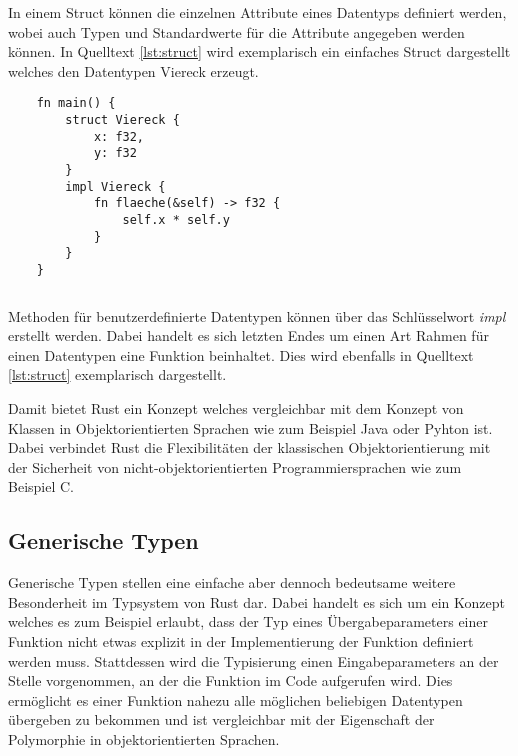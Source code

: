 In einem Struct können die einzelnen Attribute eines Datentyps definiert werden, wobei auch Typen und Standardwerte für die Attribute angegeben werden können. \autocite{rust-the-book}\autocite{rust-by-example} In Quelltext \ref{lst:struct} wird exemplarisch ein einfaches Struct dargestellt welches den Datentypen Viereck erzeugt.

\begin{verbatim}
    fn main() {
        struct Viereck {
            x: f32,
            y: f32
        }
        impl Viereck {
            fn flaeche(&self) -> f32 {
                self.x * self.y
            }
        }
    }
\end{verbatim}
\begin{lstlisting}[caption={Einfaches Struct und zugeh"orige Methode \\Quelle: \autocite{rust-the-book}}, label={lst:struct}]
\end{lstlisting}

Methoden für benutzerdefinierte Datentypen können über das Schlüsselwort \textit{impl} erstellt werden. Dabei handelt es sich letzten Endes um einen Art Rahmen für einen Datentypen eine Funktion beinhaltet. Dies wird ebenfalls in Quelltext \ref{lst:struct} exemplarisch dargestellt.

Damit bietet Rust ein Konzept welches vergleichbar mit dem Konzept von Klassen in Objektorientierten Sprachen wie zum Beispiel Java oder Pyhton ist. Dabei verbindet Rust die Flexibilitäten der klassischen Objektorientierung mit der Sicherheit von nicht-objektorientierten Programmiersprachen wie zum Beispiel C.

\subsection{Generische Typen}

Generische Typen stellen eine einfache aber dennoch bedeutsame weitere Besonderheit im Typsystem von Rust dar. Dabei handelt es sich um ein Konzept welches es zum Beispiel erlaubt, dass der Typ eines Übergabeparameters einer Funktion nicht etwas explizit in der Implementierung der Funktion definiert werden muss. Stattdessen wird die Typisierung einen Eingabeparameters an der Stelle vorgenommen, an der die Funktion im Code aufgerufen wird. \autocite{rust-the-book}\autocite{rust-by-example} Dies ermöglicht es einer Funktion nahezu alle möglichen beliebigen Datentypen übergeben zu bekommen und ist vergleichbar mit der Eigenschaft der Polymorphie in objektorientierten Sprachen.

